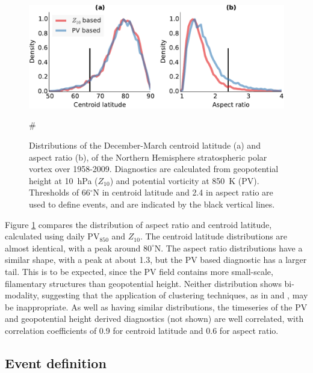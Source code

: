  \begin{figure}
 \centering 
\includegraphics[width=\textwidth]{figures/chapter-moments/moments_distribution_crop.pdf}
\caption[Distributions of $Z_{10}$ and PV-based moment
diagnostics.]{Distributions of the December-March centroid latitude (a) and
  aspect ratio (b), of the Northern Hemisphere stratospheric polar vortex over
  1958-2009. Diagnostics are calculated from geopotential height at 10~hPa
  ($Z_{10}$) and potential vorticity at 850~K (PV). Thresholds of 66$^{\circ}$N
  in centroid latitude and 2.4 in aspect ratio are used to define events, and
  are indicated by the black vertical lines.}
 \label{Fig1}#
 \end{figure}
 Figure \ref{Fig1} compares the distribution of aspect ratio and centroid
 latitude, calculated using daily PV$_{850}$ and $Z_{10}$. The centroid latitude
 distributions are almost identical, with a peak around $80^{\circ}$N. The
 aspect ratio distributions have a similar shape, with a peak at about 1.3, but
 the PV based diagnostic has a larger tail. This is to be expected, since the PV
 field contains more small-scale, filamentary structures than geopotential
 height. Neither distribution shows bi-modality, suggesting that the application
 of clustering techniques, as in \citet{K.Coughlin2009} and
 \citet{Hannachi2010}, may be inappropriate. As well as having similar
 distributions, the timeseries of the PV and geopotential height derived
 diagnostics (not shown) are well correlated, with correlation coefficients of
 0.9 for centroid latitude and 0.6 for aspect ratio.



\subsection{Event definition}
\label{sec:event-definition}

